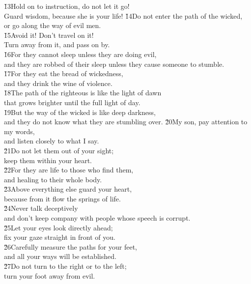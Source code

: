 \begin{poetry}
\poeml \v{13}Hold on to instruction, do not let it go! \\
\poemll    Guard wisdom, because she is your life!
\poeml \v{14}Do not enter the path of the wicked, \\
\poemll    or go along the way of evil men. \\
\poeml \v{15}Avoid it! Don't travel on it! \\
\poemll    Turn away from it, and pass on by. \\
\poeml \v{16}For they cannot sleep unless they are doing evil, \\
\poemll    and they are robbed of their sleep unless they cause someone to stumble. \\
\poeml \v{17}For they eat the bread of wickedness, \\
\poemll    and they drink the wine of violence. \\
\poeml \v{18}The path of the righteous is like the light of dawn \\
\poemll    that grows brighter until the full light of day. \\
\poeml \v{19}But the way of the wicked is like deep darkness, \\
\poemll    and they do not know what they are stumbling over.
\poeml \v{20}My son, pay attention to my words, \\
\poemll    and listen closely to what I say. \\
\poeml \v{21}Do not let them out of your sight; \\
\poemll    keep them within your heart. \\
\poeml \v{22}For they are life to those who find them, \\
\poemll    and healing to their whole body. \\
\poeml \v{23}Above everything else guard your heart, \\
\poemll    because from it flow the springs of life. \\
\poeml \v{24}Never talk deceptively \\
\poemll    and don't keep company with people whose speech is corrupt. \\
\poeml \v{25}Let your eyes look directly ahead; \\
\poemll    fix your gaze straight in front of you. \\
\poeml \v{26}Carefully measure the paths for your feet, \\
\poemll    and all your ways will be established. \\
\poeml \v{27}Do not turn to the right or to the left; \\
\poemll    turn your foot away from evil.
\end{poetry}


